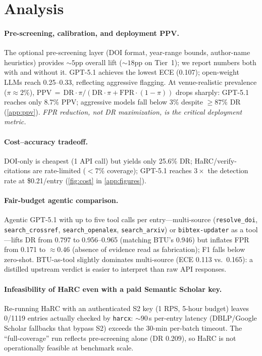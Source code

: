 \section{Analysis}
\label{sec:analysis}

\paragraph{Pre-screening, calibration, and deployment PPV.}
\label{sec:prescreening}
\label{sec:calibration}
\label{sec:ppv}
The optional pre-screening layer (DOI format, year-range bounds, author-name heuristics) provides ${\sim}5$pp overall lift (${\sim}18$pp on Tier~1); we report numbers both with and without it.
GPT-5.1 achieves the lowest ECE (0.107); open-weight LLMs reach 0.25--0.33, reflecting aggressive flagging.
At venue-realistic prevalence ($\pi{\approx}2\%$), $\text{PPV}\,=\,\text{DR}\cdot\pi / (\text{DR}\cdot\pi + \text{FPR}\cdot(1{-}\pi))$ drops sharply: GPT-5.1 reaches only 8.7\% PPV; aggressive models fall below 3\% despite ${\geq}87\%$ DR (\cref{app:ppv}). \emph{FPR reduction, not DR maximization, is the critical deployment metric.}

\paragraph{Cost--accuracy tradeoff.}
\label{sec:cost}
DOI-only is cheapest (1 API call) but yields only 25.6\% DR; HaRC/verify-citations are rate-limited ($<$7\% coverage); GPT-5.1 reaches $3{\times}$ the detection rate at \$0.21/entry (\cref{fig:cost} in \cref{app:figures}).

\paragraph{Fair-budget agentic comparison.}
\label{sec:agentic}
Agentic GPT-5.1 with up to five tool calls per entry---multi-source (\texttt{resolve\_doi}, \texttt{search\_crossref}, \texttt{search\_openalex}, \texttt{search\_arxiv}) or \texttt{bibtex-updater} as a tool---lifts DR from 0.797 to 0.956--0.965 (matching BTU's 0.946) but inflates FPR from 0.171 to ${\approx}0.46$ (absence of evidence read as fabrication); F1 falls below zero-shot.
BTU-as-tool slightly dominates multi-source (ECE 0.113 vs.\ 0.165): a distilled upstream verdict is easier to interpret than raw API responses.

\paragraph{Infeasibility of HaRC even with a paid Semantic Scholar key.}
\label{sec:harc_feasibility}
Re-running HaRC with an authenticated S2 key (1 RPS, 5-hour budget) leaves 0/1119 entries actually checked by \texttt{harcx}: ${\sim}90$\,s per-entry latency (DBLP/Google Scholar fallbacks that bypass S2) exceeds the 30-min per-batch timeout. The ``full-coverage'' run reflects pre-screening alone (DR 0.209), so HaRC is not operationally feasible at benchmark scale.

